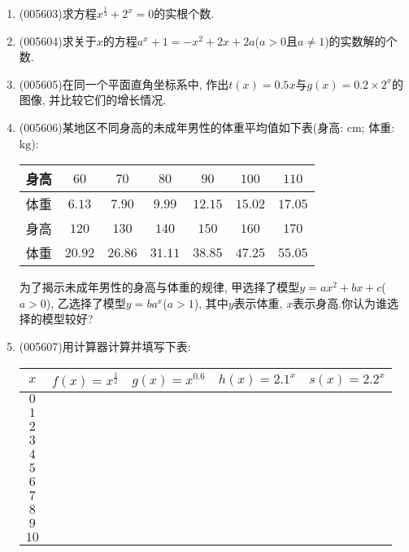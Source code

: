\documentclass[10pt,a4paper]{article}
\begin{document}
\begin{enumerate}[1.]
\item {\tiny (005603)}求方程$x^{\frac 13}+2^x=0$的实根个数.
\item {\tiny (005604)}求关于$x$的方程$a^x+1=-x^2+2x+2a$($a>0$且$a\ne 1$)的实数解的个数.
\item {\tiny (005605)}在同一个平面直角坐标系中, 作出$t(x)=0.5x$与$g(x)=0.2\times 2^x$的图像, 并比较它们的增长情况.
\item {\tiny (005606)}某地区不同身高的未成年男性的体重平均值如下表(身高: $\text{cm}$; 体重: $\text{kg}$):
\begin{center}
    \begin{tabular}{|c|c|c|c|c|c|c|}
        \hline
        身高 & $60$ & $70$ & $80$ & $90$ & $100$ & $110$\\ \hline
        体重 & $6.13$ & $7.90$ & $9.99$ & $12.15$ & $15.02$ & $17.05$\\ \hline
        身高 & $120$ & $130$ & $140$ & $150$ & $160$ & $170$\\ \hline
        体重 & $20.92$ & $26.86$ & $31.11$ & $38.85$ & $47.25$ & $55.05$\\ \hline
    \end{tabular}
\end{center}
为了揭示未成年男性的身高与体重的规律, 甲选择了模型$y=ax^2+bx+c$($a>0$), 乙选择了模型$y=ba^x$($a>1$), 其中$y$表示体重, $x$表示身高.你认为谁选择的模型较好?
\item {\tiny (005607)}用计算器计算并填写下表:
\begin{center}
    \begin{tabular}{|c|c|c|c|c|}
        \hline
        $x$	& $f(x)=x^{\frac 12}$ & $g(x)=x^{0.6}$ & $h(x)=2.1^x$ & $s(x)=2.2^x$ \\ \hline
        $0$ & & & & \\ \hline
        $1$ & & & & \\ \hline
        $2$ & & & & \\ \hline
        $3$ & & & & \\ \hline
        $4$ & & & & \\ \hline
        $5$ & & & & \\ \hline
        $6$ & & & & \\ \hline
        $7$ & & & & \\ \hline
        $8$ & & & & \\ \hline
        $9$ & & & & \\ \hline
        $10$ & & & & \\ \hline
    \end{tabular}
\end{center}

\end{enumerate}
\end{document}
